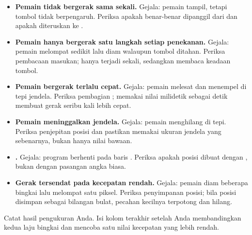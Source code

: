 \begin{galatbox}
\begin{itemize}[leftmargin=1.4em, itemsep=0.35em]
  \item \textbf{Pemain tidak bergerak sama sekali.}
        Gejala: pemain tampil, tetapi tombol tidak berpengaruh. Periksa apakah
         benar-benar dipanggil dari  dan apakah
         diteruskan ke .
  \item \textbf{Pemain hanya bergerak satu langkah setiap penekanan.}
        Gejala: pemain melompat sedikit lalu diam walaupun tombol ditahan.
        Periksa pembacaan masukan;  hanya terjadi sekali,
        sedangkan  membaca keadaan tombol.
  \item \textbf{Pemain bergerak terlalu cepat.}
        Gejala: pemain melesat dan menempel di tepi jendela. Periksa pembagian
        ; memakai nilai milidetik sebagai detik membuat gerak
        seribu kali lebih cepat.
  \item \textbf{Pemain meninggalkan jendela.}
        Gejala: pemain menghilang di tepi. Periksa penjepitan posisi dan
        pastikan  memakai ukuran jendela yang sebenarnya,
        bukan hanya nilai bawaan.
  \item \textbf{.}
        Gejala: program berhenti pada baris . Periksa apakah
        posisi dibuat dengan , bukan dengan pasangan
        angka biasa.
  \item \textbf{Gerak tersendat pada kecepatan rendah.}
        Gejala: pemain diam beberapa bingkai lalu melompat satu piksel.
        Periksa penyimpanan posisi; bila posisi disimpan sebagai bilangan
        bulat, pecahan kecilnya terpotong dan hilang.
\end{itemize}
\end{galatbox}


Catat hasil pengukuran Anda. Isi kolom terakhir setelah Anda membandingkan
kedua laju bingkai dan mencoba satu nilai kecepatan yang lebih rendah.

